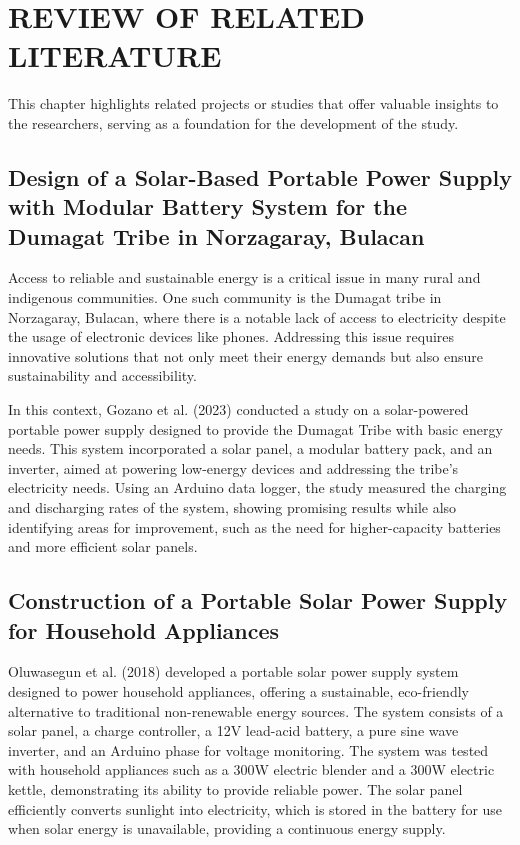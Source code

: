 \chapter{REVIEW OF RELATED LITERATURE}
{\baselineskip
This chapter highlights related projects or studies that offer valuable insights to the researchers, serving as a foundation for the development of the study.

\section{ Design of a Solar-Based Portable Power Supply with Modular Battery System for the Dumagat Tribe in Norzagaray, Bulacan}

Access to reliable and sustainable energy is a critical issue in many rural and indigenous communities. One such community is the Dumagat tribe in Norzagaray, Bulacan, where there is a notable lack of access to electricity despite the usage of electronic devices like phones. Addressing this issue requires innovative solutions that not only meet their energy demands but also ensure sustainability and accessibility. 

In this context, Gozano et al. (2023) conducted a study on a solar-powered portable power supply designed to provide the Dumagat Tribe with basic energy needs. This system incorporated a solar panel, a modular battery pack, and an inverter, aimed at powering low-energy devices and addressing the tribe’s electricity needs. Using an Arduino data logger, the study measured the charging and discharging rates of the system, showing promising results while also identifying areas for improvement, such as the need for higher-capacity batteries and more efficient solar panels.

\section{Construction of a Portable Solar Power Supply for Household Appliances}

Oluwasegun et al. (2018) developed a portable solar power supply system designed to power household appliances, offering a sustainable, eco-friendly alternative to traditional non-renewable energy sources. The system consists of a solar panel, a charge controller, a 12V lead-acid battery, a pure sine wave inverter, and an Arduino phase for voltage monitoring. The system was tested with household appliances such as a 300W electric blender and a 300W electric kettle, demonstrating its ability to provide reliable power. The solar panel efficiently converts sunlight into electricity, which is stored in the battery for use when solar energy is unavailable, providing a continuous energy supply.

}
